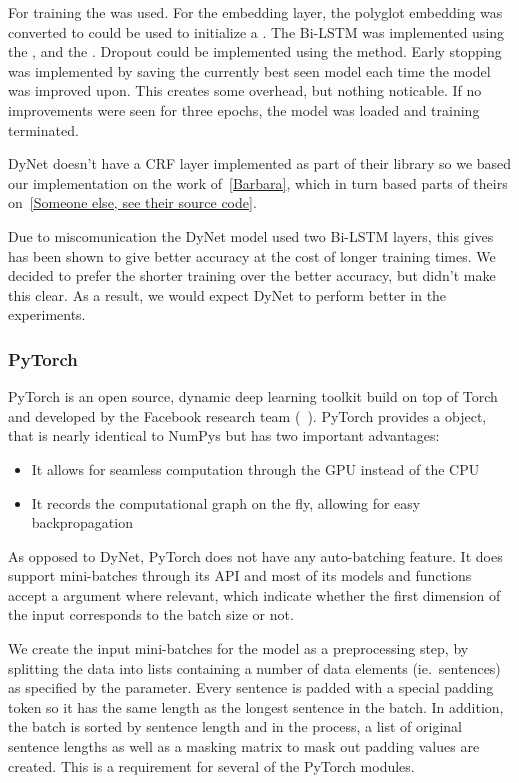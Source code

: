 For training the  was used. For the embedding layer, the
polyglot embedding was converted to could be used to initialize a
. The Bi-LSTM was implemented using the
, and the . Dropout could be implemented
using the  method. Early stopping was implemented by saving the
currently best seen model each time the model was improved upon. This creates
some overhead, but nothing noticable. If no improvements were seen for three
epochs, the model was loaded and training terminated.

DyNet doesn't have a CRF layer implemented as part of their library so we based
our implementation on the work of~\ref{Barbara}, which in turn based parts of
theirs on~\ref{Someone else, see their source code}. 

Due to miscomunication the DyNet model used two Bi-LSTM layers, this gives has
been shown to give better accuracy at the cost of longer training times. We
decided to prefer the shorter training over the better accuracy, but didn't make
this clear. As a result, we would expect DyNet to perform better in the
experiments.


\subsubsection*{PyTorch}\label{sec:setup-implementations-pytorch}

PyTorch is an open source, dynamic deep learning toolkit build on top of Torch
and developed by the Facebook research team (~\cite{yegulalp2017facebook}).
PyTorch provides a  object, that is nearly identical to NumPys
 but has two important advantages:

\begin{itemize}
    \item It allows for seamless computation through the GPU instead of the CPU
    \item It records the computational graph on the fly, allowing for easy
        backpropagation
\end{itemize}

As opposed to DyNet, PyTorch does not have any auto-batching feature. It does
support mini-batches through its API and most of its models and functions accept
a  argument where relevant, which indicate whether the first
dimension of the input corresponds to the batch size or not.

We create the input mini-batches for the model as a preprocessing step, by
splitting the data into lists containing a number of data elements (ie.\
sentences) as specified by the  parameter. Every sentence is
padded with a special padding token \code{`<PAD>'} so it has the same length as
the longest sentence in the batch. In addition, the batch is sorted by sentence
length and in the process, a list of original sentence lengths as well as a
masking matrix to mask out padding values are created. This is a requirement for
several of the PyTorch modules.

